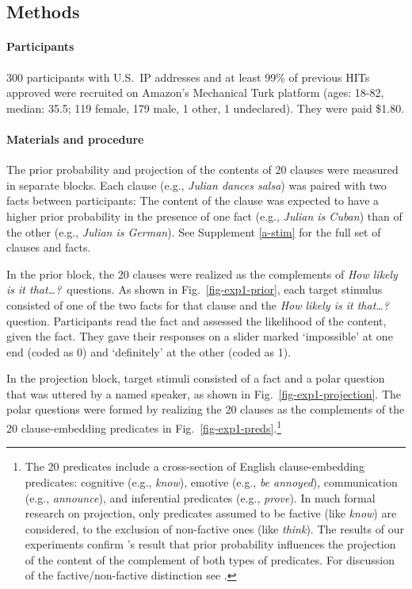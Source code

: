 \documentclass[11pt,fleqn]{article}
\newcommand{\6}{\mbox{$[\hspace*{-.6mm}[$}}
\newcommand{\9}{\mbox{$]\hspace*{-.6mm}]$}}
\newcommand{\citepos}[1]{\citeauthor{#1}'s \citeyear{#1}}
\begin{document}
\subsection{Methods} 
 
\paragraph{Participants} 300 participants with U.S.\ IP addresses and at least 99\% of previous HITs approved were recruited on Amazon's Mechanical Turk platform (ages: 18-82, median: 35.5; 119 female, 179 male, 1 other, 1 undeclared). They were paid \$1.80.

\paragraph{Materials and procedure} The prior probability and projection of the contents of 20 clauses were measured in separate blocks. Each clause (e.g., \emph{Julian dances salsa}) was paired with two facts between participants: The content of the clause was expected to have a higher prior probability in the presence of one fact (e.g., \emph{Julian is Cuban}) than of the other (e.g., \emph{Julian is German}). See Supplement \ref{a-stim} for the full set of clauses and facts. 

In the prior block, the 20 clauses were realized as the complements of {\em How likely is it that\ldots?}~questions. As shown in Fig.~\ref{fig-exp1-prior}, each target stimulus consisted of one of the two facts for that clause and the {\em How likely is it that\ldots?} question. 
Participants read the fact and assessed the likelihood of the content, given the fact. They gave their responses on a slider marked `impossible' at one end (coded as 0) and `definitely' at the other (coded as 1). 

In the projection block, target stimuli consisted of a fact and a polar question that was uttered by a named speaker, as shown in Fig.~\ref{fig-exp1-projection}. The polar questions were formed by realizing the 20 clauses as the complements of the 20 clause-embedding predicates in Fig.~\ref{fig-exp1-preds}.\footnote{The 20 predicates include a cross-section of English clause-embedding predicates: cognitive (e.g., {\em know}), emotive (e.g., {\em be annoyed}), communication (e.g., {\em announce}), and inferential predicates (e.g., {\em prove}). In much formal research on projection, only predicates assumed to be factive (like {\em know}) are considered, to the exclusion of non-factive ones (like {\em think}). The results of our experiments confirm \citepos{mahler2020} result that prior probability influences the projection of the content of the complement of both types of predicates. For discussion of the factive/non-factive distinction see .} 
\end{document}
